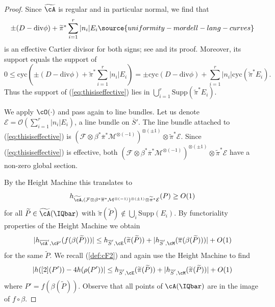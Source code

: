 \begin{proof}
Since $\widetilde{\cA}$ is regular and in particular normal, we find  that
\begin{equation}
\label{eq:thisiseffective}\pm(D - \mathrm{div}\phi) + \widetilde\pi^*\sum_{i=1}^r |n_i|E_i
\source{uniformity-mordell-lang-curves}
\end{equation}
is an effective Cartier divisor for both  signs;
see \cite[Theorem~11.38(1)]{GoertzWedhorn} and its proof.
Moreover, its support equals the support of
$$0\le \mathrm{cyc}\left(\pm (D-\mathrm{div}\phi) + \widetilde\pi^*\sum_{i=1}^r |n_i|
  E_i\right) =
\pm \mathrm{cyc}(D-\mathrm{div}\phi) + \sum_{i=1}^r |n_i|\mathrm{cyc}(\widetilde\pi^*E_i).$$
Thus the support of (\ref{eq:thisiseffective}) lies in
$\bigcup_{i=1}^r \mathrm{Supp}(\widetilde\pi^* E_i)$.


We apply $\cO(\cdot)$ and pass  again  to line bundles.
Let us denote $\mathcal{E} = \mathcal{O}(\sum_{i=1}^r |n_i| E_i)$, a
line bundle on $\overline S'$. The line bundle attached to
 (\ref{eq:thisiseffective}) is $(\mathcal{F}\otimes\beta^*\overline\pi^*\mathcal{M}^{\otimes(-1)}
 )^{\otimes(\pm 1)}\otimes\widetilde\pi^*\mathcal{E}$.
 Since (\ref{eq:thisiseffective}) is effective, both
$(\mathcal{F}\otimes\beta^*\overline\pi^*\mathcal{M}^{\otimes(-1)}
 )^{\otimes(\pm 1)}\otimes \widetilde\pi^*\mathcal{E}$
have a non-zero global
 section.

By the Height Machine this translates to
 \begin{equation*}
   h_{\widetilde \cA,(\mathcal{F}\otimes\beta^*\overline\pi^*\mathcal{M}^{\otimes(-1)}
 )^{\otimes(\pm 1)}\otimes \widetilde\pi^*\mathcal{E}}(P)\ge O(1)
 \end{equation*}
 for all $\widetilde P\in \widetilde\cA(\IQbar)$
with $\widetilde\pi(\widetilde P)\not\in\bigcup_i \mathrm{Supp}(E_i)$.
By functoriality properties of  the Height Machine we obtain
 \begin{equation*}
  |h_{\overline \cA',\cF'}(f(\beta(\widetilde P)))| \le h_{\overline S',\cE}(\widetilde\pi(\widetilde P)) + |h_{\overline
    S', \cM}(\overline{\pi}(\beta(\widetilde P)))|
  +O(1)
 \end{equation*}
 for the same $\widetilde P$.
 We recall (\ref{def:cF2}) and again use the Height Machine to find
 \begin{equation*}
\left|   \hcA([2](P')) - 4
   \hcA(\rho(P'))\right|   \le h_{\overline
   S',\cE}(\widetilde\pi(\widetilde P)) + |h_{\overline S',
     \cM}(\widetilde\pi(\widetilde P))|
  +O(1)
 \end{equation*}
where $P'=f(\beta(\widetilde P))$. Observe that all points of $\cA(\IQbar)$ are
in the image of $f\circ \beta$.


\end{proof}
